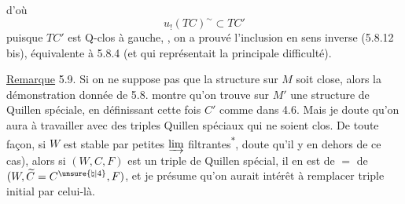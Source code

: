 
d'où
\[
 u_{!}(TC)^{\sim}\subset TC'
\]
puisque $TC'$ est Q-clos à gauche,  ,  on a  prouvé l'inclusion en sens inverse (5.8.12 bis),
 équivalente à 5.8.4 (et qui représentait
la principale difficulté).

\uline{Remarque} 5.9. Si on ne suppose pas que la
 structure sur $M$ soit close, alors
la démonstration donnée de 5.8. montre
qu'on trouve  sur $M'$ une
structure de Quillen spéciale, en définissant
cette fois $C'$ comme dans 4.6. Mais je
doute qu'on aura  à travailler avec des
triples  Quillen spéciaux qui ne soient
clos. De toute façon, si $W$ est
stable par petites $\varinjlim$ filtrantes\textsuperscript{$*$},
  doute qu'il y   
en dehors de ce cas), alors si
$(W,C,F)$ est un triple de Quillen
spécial, il en est de $=$ de $(W,\widetilde C=C^{\unsure{\natural|4}},F)$,
et je présume qu'on  aurait intérêt
à remplacer  triple initial par celui-là.

